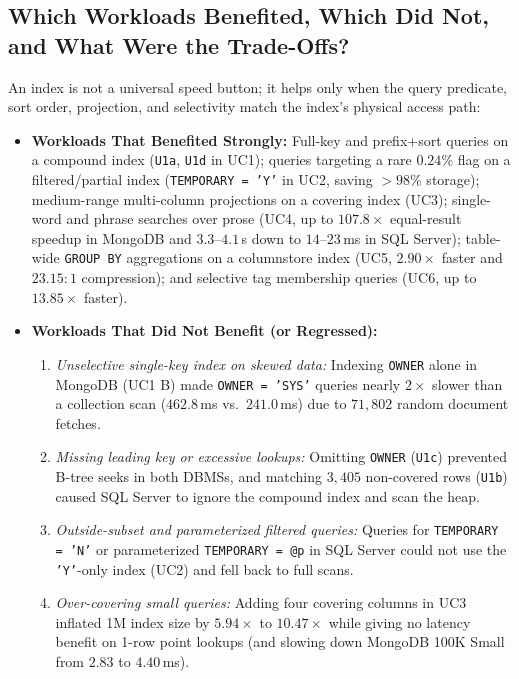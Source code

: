 \subsection{Which Workloads Benefited, Which Did Not, and What Were the Trade-Offs?}
An index is not a universal speed button; it helps only when the query predicate, sort order, projection, and selectivity match the index's physical access path:
\begin{itemize}
\item \textbf{Workloads That Benefited Strongly:} Full-key and prefix+sort queries on a compound index (\texttt{U1a}, \texttt{U1d} in UC1); queries targeting a rare $0.24\%$ flag on a filtered/partial index (\texttt{TEMPORARY = 'Y'} in UC2, saving $>98\%$ storage); medium-range multi-column projections on a covering index (UC3); single-word and phrase searches over prose (UC4, up to $107.8\times$ equal-result speedup in MongoDB and $3.3$--$4.1$\,s down to $14$--$23$\,ms in SQL Server); table-wide \texttt{GROUP BY} aggregations on a columnstore index (UC5, $2.90\times$ faster and $23.15:1$ compression); and selective tag membership queries (UC6, up to $13.85\times$ faster).
\item \textbf{Workloads That Did Not Benefit (or Regressed):}
  \begin{enumerate}
  \item \emph{Unselective single-key index on skewed data:} Indexing \texttt{OWNER} alone in MongoDB (UC1 B) made \texttt{OWNER = 'SYS'} queries nearly $2\times$ slower than a collection scan ($462.8$\,ms vs.\ $241.0$\,ms) due to $71,802$ random document fetches.
  \item \emph{Missing leading key or excessive lookups:} Omitting \texttt{OWNER} (\texttt{U1c}) prevented B-tree seeks in both DBMSs, and matching $3,405$ non-covered rows (\texttt{U1b}) caused SQL Server to ignore the compound index and scan the heap.
  \item \emph{Outside-subset and parameterized filtered queries:} Queries for \texttt{TEMPORARY = 'N'} or parameterized \texttt{TEMPORARY = @p} in SQL Server could not use the \texttt{'Y'}-only index (UC2) and fell back to full scans.
  \item \emph{Over-covering small queries:} Adding four covering columns in UC3 inflated 1M index size by $5.94\times$ to $10.47\times$ while giving no latency benefit on 1-row point lookups (and slowing down MongoDB 100K Small from $2.83$ to $4.40$\,ms).
  \end{enumerate}
\end{itemize}

